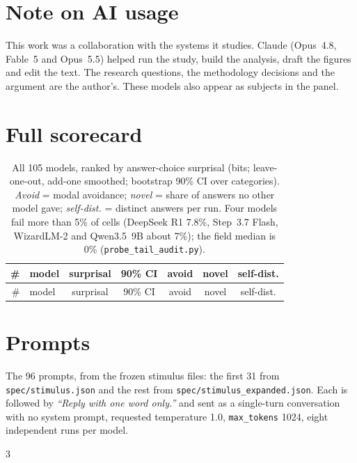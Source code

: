 \documentclass[11pt]{article}
\begin{document}
\fussy
\section*{Note on AI usage}
This work was a collaboration with the systems it studies. Claude (Opus~4.8, Fable~5 and Opus~5.5) helped run the study, build the analysis, draft the figures and edit the text. The research questions, the methodology decisions and the argument are the author's. These models also appear as subjects in the panel.




\appendix
\clearpage

\section{Full scorecard}
\label{app:scorecard}

{\small
\setlength{\tabcolsep}{4.5pt}
\begin{longtable}{rlccccc}
\caption{All 105 models, ranked by answer-choice surprisal (bits; leave-one-out, add-one smoothed; bootstrap 90\% CI over categories). \emph{Avoid} = modal avoidance; \emph{novel} = share of answers no other model gave; \emph{self-dist.} = distinct answers per run. Four models fail more than 5\% of cells (DeepSeek R1 7.8\%, Step~3.7 Flash, WizardLM-2 and Qwen3.5~9B about 7\%); the field median is 0\% (\texttt{probe\_tail\_audit.py}).}
\label{tab:scorecard}\\
\toprule
\# & model & surprisal & 90\% CI & avoid & novel & self-dist. \\
\midrule
\endfirsthead
\toprule
\# & model & surprisal & 90\% CI & avoid & novel & self-dist. \\
\midrule
\endhead

\end{longtable}
}

\section{Prompts}
\label{app:prompts}
The 96 prompts, from the frozen stimulus files: the first 31 from \texttt{spec/stimulus.json} and the rest from \texttt{spec/stimulus\_expanded.json}. Each is followed by \emph{``Reply with one word only.''} and sent as a single-turn conversation with no system prompt, requested temperature 1.0, \texttt{max\_tokens} 1024, eight independent runs per model.

\begin{multicols}{3}
\small
\begin{itemize}\setlength{\itemsep}{0pt}

\end{itemize}
\end{multicols}
\end{document}
